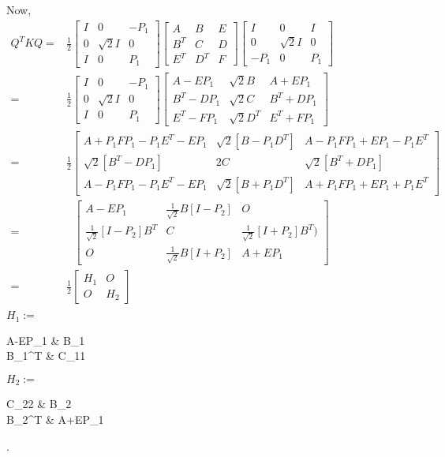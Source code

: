 Now, 
\mathleft
\begin{equation}
\begin{split}
Q^TKQ  = & 
\frac{1}{2}
\begin{bmatrix}
I & 0 & -P_1\\
0 & \sqrt{2}I & 0\\
I & 0 & P_1
\end{bmatrix}
\begin{bmatrix}
A & B & E\\
B^T & C & D\\
E^T & D^T & F
\end{bmatrix}
\begin{bmatrix}
I & 0 & I\\
0 & \sqrt{2}I & 0\\
-P_1 & 0 & P_1
\end{bmatrix} \\
 = & 
 \frac{1}{2}
\begin{bmatrix}
I & 0 & -P_1\\
0 & \sqrt{2}I & 0\\
I & 0 & P_1
\end{bmatrix}
\begin{bmatrix}
A-EP_1 & \sqrt{2}B & A+EP_1\\
B^T -DP_1 & \sqrt{2}C & B^T+DP_1\\
 E^T-FP_1 & \sqrt{2}D^T & E^T+FP_1
\end{bmatrix}\\
 = & 
 \frac{1}{2}
\begin{bmatrix}
A+P_1FP_1-P_1E^T-EP_1 & \sqrt{2}[B-P_1D^T] & A-P_1FP_1+EP_1-P_1E^T\\
\sqrt{2}[B^T -DP_1] & 2C & \sqrt{2}[B^T+DP_1]\\
 A-P_1FP_1-P_1E^T-EP_1 & \sqrt{2}[B+P_1D^T] & A+P_1FP_1+EP_1+P_1E^T
\end{bmatrix}\\
= & \ \ \ 
\begin{bmatrix}
A-EP_1 & \frac{1}{\sqrt{2}}B[I-P_2] & O\\
\frac{1}{\sqrt{2}}[I-P_2]B^T & C & \frac{1}{\sqrt{2}}[I+P_2]B^T)\\
 O & \frac{1}{\sqrt{2}}B[I+P_2] & A+EP_1
\end{bmatrix}\\
 = & 
 \frac{1}{2}
\begin{bmatrix}
H_1 & O \\
O & H_2
\end{bmatrix}\\
\end{split}    
\end{equation}
\mathcenter
{}
$H_1 :=$ \begin{bmatrix}
A-EP_1 & B_1 \\
\sqrt{2}B_1^T & C_{11}
\end{bmatrix}
$H_2 := $ \begin{bmatrix}
C_{22} & B_2 \\
\sqrt{2}B_2^T & A+EP_1
\end{bmatrix}.

